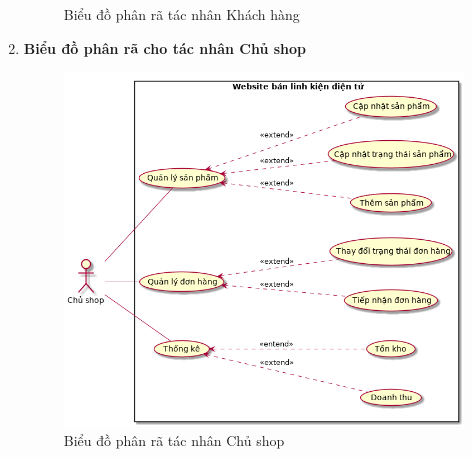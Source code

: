 \begin{enumerate}[label=\textbf{\alph*)}]
\begin{figure}[h!]
        \caption{Biểu đồ phân rã tác nhân Khách hàng}
    \end{figure}
\newpage
\item \textbf{Biểu đồ phân rã cho tác nhân Chủ shop}
    \begin{figure}[h!]
        \centering
        \includegraphics[scale=0.6]{fig/uc_admin.png}
        \caption{Biểu đồ phân rã tác nhân Chủ shop}
    \end{figure}
\end{enumerate}
